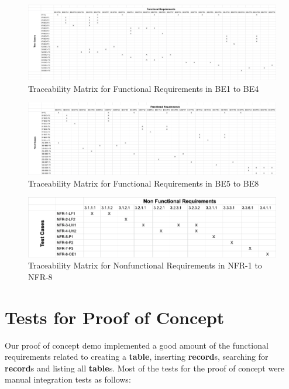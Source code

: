 \documentclass[12pt, titlepage]{article}
\begin{document}
\begin{figure}[H]
    \centering
    \includegraphics[scale=0.25, angle=90]{FR-1.png}
    \caption{Traceability Matrix for Functional Requirements in BE1 to BE4}
    \label{fig:my_label}
\end{figure}

\begin{figure}[H]
    \centering
    \includegraphics[scale=0.25, angle=90]{FR-2.png}
    \caption{Traceability Matrix for Functional Requirements in BE5 to BE8}
    \label{fig:my_label}
\end{figure}

\begin{figure}[H]
    \centering
    \includegraphics[scale=0.50, angle=90]{NFR.png}
    \caption{Traceability Matrix for Nonfunctional Requirements in NFR-1 to NFR-8}
    \label{fig:my_label}
\end{figure}

\section{Tests for Proof of Concept}

Our proof of concept demo implemented a good amount of the functional requirements related to creating a \textbf{table}, inserting \textbf{record}s, searching for \textbf{record}s and listing all \textbf{table}s. Most of the tests for the proof of concept were manual integration tests as follows:
\end{document}
